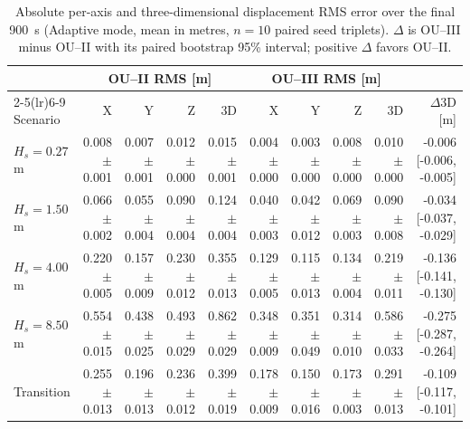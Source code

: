 \begin{table}[t]
  \centering
  \caption{Absolute per-axis and three-dimensional displacement RMS error over the final \SI{900}{s} (Adaptive mode, mean in metres, $n=10$ paired seed triplets). $\Delta$ is OU--III minus OU--II with its paired bootstrap 95\% interval; positive $\Delta$ favors OU--II.}
  \label{tab:ou_mc_axes}
  \footnotesize
  \setlength{\tabcolsep}{3.0pt}
  \begin{tabular}{@{}lrrrrrrrrr@{}}
    \toprule
    & \multicolumn{4}{c}{OU--II RMS [m]} & \multicolumn{4}{c}{OU--III RMS [m]} & \\
    \cmidrule(lr){2-5}\cmidrule(lr){6-9}
    Scenario & X & Y & Z & 3D & X & Y & Z & 3D & $\Delta$3D [m] \\
    \midrule
    $H_s=0.27$ m & 0.008 $\pm$ 0.001 & 0.007 $\pm$ 0.001 & 0.012 $\pm$ 0.000 & 0.015 $\pm$ 0.001 & 0.004 $\pm$ 0.000 & 0.003 $\pm$ 0.000 & 0.008 $\pm$ 0.000 & 0.010 $\pm$ 0.000 & -0.006 [-0.006, -0.005] \\
    $H_s=1.50$ m & 0.066 $\pm$ 0.002 & 0.055 $\pm$ 0.004 & 0.090 $\pm$ 0.004 & 0.124 $\pm$ 0.004 & 0.040 $\pm$ 0.003 & 0.042 $\pm$ 0.012 & 0.069 $\pm$ 0.003 & 0.090 $\pm$ 0.008 & -0.034 [-0.037, -0.029] \\
    $H_s=4.00$ m & 0.220 $\pm$ 0.005 & 0.157 $\pm$ 0.009 & 0.230 $\pm$ 0.012 & 0.355 $\pm$ 0.013 & 0.129 $\pm$ 0.005 & 0.115 $\pm$ 0.013 & 0.134 $\pm$ 0.004 & 0.219 $\pm$ 0.011 & -0.136 [-0.141, -0.130] \\
    $H_s=8.50$ m & 0.554 $\pm$ 0.015 & 0.438 $\pm$ 0.025 & 0.493 $\pm$ 0.029 & 0.862 $\pm$ 0.029 & 0.348 $\pm$ 0.009 & 0.351 $\pm$ 0.049 & 0.314 $\pm$ 0.010 & 0.586 $\pm$ 0.033 & -0.275 [-0.287, -0.264] \\
    Transition & 0.255 $\pm$ 0.013 & 0.196 $\pm$ 0.013 & 0.236 $\pm$ 0.012 & 0.399 $\pm$ 0.019 & 0.178 $\pm$ 0.009 & 0.150 $\pm$ 0.016 & 0.173 $\pm$ 0.003 & 0.291 $\pm$ 0.013 & -0.109 [-0.117, -0.101] \\
    \bottomrule
  \end{tabular}
\end{table}



